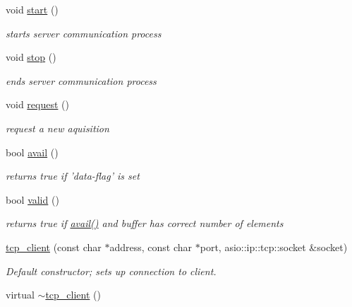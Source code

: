 \begin{DoxyCompactItemize}
\item 
void \hyperlink{classhokuyo_1_1tcp__client_a43b62c13de109820ab4e804efd76a95c}{start} ()
\begin{DoxyCompactList}\small\item\em starts server communication process \end{DoxyCompactList}\item 
void \hyperlink{classhokuyo_1_1tcp__client_ab54b7c58e9ad125e42624744e26d22d4}{stop} ()
\begin{DoxyCompactList}\small\item\em ends server communication process \end{DoxyCompactList}\item 
\hypertarget{classhokuyo_1_1tcp__client_a43cf16989bd80fece9849064ecd284b6}{void \hyperlink{classhokuyo_1_1tcp__client_a43cf16989bd80fece9849064ecd284b6}{request} ()}\label{classhokuyo_1_1tcp__client_a43cf16989bd80fece9849064ecd284b6}

\begin{DoxyCompactList}\small\item\em request a new aquisition \end{DoxyCompactList}\item 
\hypertarget{classhokuyo_1_1tcp__client_a130f57b5d6d61da417b3cbaac82c2afc}{bool \hyperlink{classhokuyo_1_1tcp__client_a130f57b5d6d61da417b3cbaac82c2afc}{avail} ()}\label{classhokuyo_1_1tcp__client_a130f57b5d6d61da417b3cbaac82c2afc}

\begin{DoxyCompactList}\small\item\em returns true if 'data-\/flag' is set \end{DoxyCompactList}\item 
\hypertarget{classhokuyo_1_1tcp__client_adcb05f1bd91648a1971d55fb0f3795d7}{bool \hyperlink{classhokuyo_1_1tcp__client_adcb05f1bd91648a1971d55fb0f3795d7}{valid} ()}\label{classhokuyo_1_1tcp__client_adcb05f1bd91648a1971d55fb0f3795d7}

\begin{DoxyCompactList}\small\item\em returns true if \hyperlink{classhokuyo_1_1tcp__client_a130f57b5d6d61da417b3cbaac82c2afc}{avail()} and buffer has correct number of elements \end{DoxyCompactList}\item 
\hyperlink{classhokuyo_1_1tcp__client_a1890aa338d5513f3a7f8a8d05d2c7f18}{tcp\-\_\-client} (const char $\ast$address, const char $\ast$port, asio\-::ip\-::tcp\-::socket \&socket)
\begin{DoxyCompactList}\small\item\em Default constructor; sets up connection to client. \end{DoxyCompactList}\item 
\hypertarget{classhokuyo_1_1tcp__client_ad3a0b2ba1df3334d3ea0710597c7ac71}{virtual \hyperlink{classhokuyo_1_1tcp__client_ad3a0b2ba1df3334d3ea0710597c7ac71}{$\sim$tcp\-\_\-client} ()}\label{classhokuyo_1_1tcp__client_ad3a0b2ba1df3334d3ea0710597c7ac71}


\end{DoxyCompactItemize}

